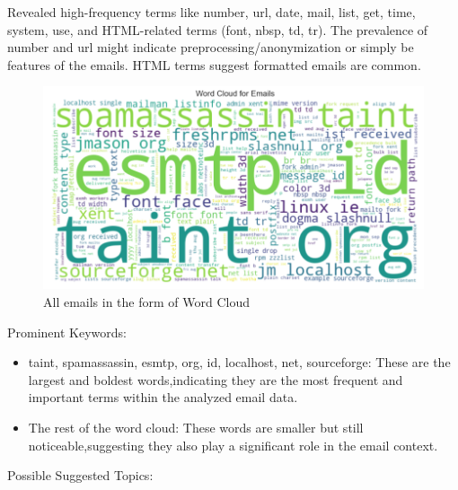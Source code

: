 Revealed high-frequency terms like number, url, date, mail, list, get, time, system, use, and HTML-related terms
(font, nbsp, td, tr).
The prevalence of number and url might indicate preprocessing/anonymization or simply be features of the emails.
HTML terms suggest formatted emails are common.

\begin{figure}[H]
    \centering
    \includegraphics[width=\linewidth]{images/word_cloud}
    \caption{All emails in the form of Word Cloud}
    \label{fig:word_cloud}
\end{figure}

\smallskip
Prominent Keywords:

\begin{itemize}
    \item taint, spamassassin, esmtp, org, id, localhost, net, sourceforge: These are the largest and boldest words,indicating they are the most frequent and important terms within the analyzed email data.
    \item The rest of the word cloud: These words are smaller but still noticeable,suggesting they also play a significant role in the email context.
\end{itemize}

Possible Suggested Topics:

